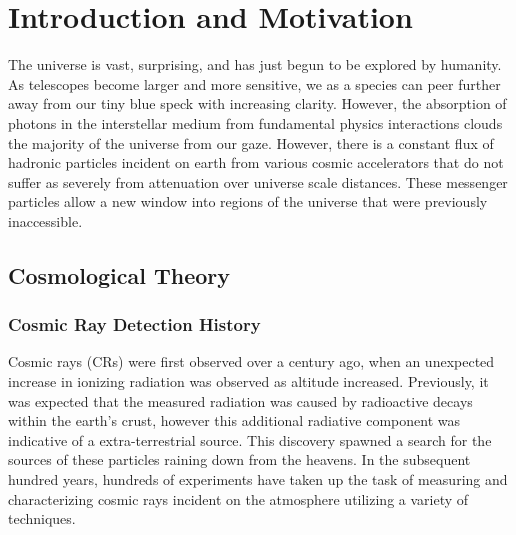 



\chapter{Introduction and Motivation}
		The universe is vast, surprising, and has just begun to be explored by humanity.  As telescopes become larger and more sensitive, we as a species can peer further away from our tiny blue speck with increasing clarity.  However, the absorption of photons in the interstellar medium from fundamental physics interactions clouds the majority of the universe from our gaze.  However, there is a constant flux of hadronic particles incident on earth from various cosmic accelerators that do not suffer as severely from attenuation over universe scale distances.  These messenger particles allow a new window into regions of the universe that were previously inaccessible.
\section{Cosmological Theory}
	\subsection{Cosmic Ray Detection History}
	Cosmic rays (CRs) were first observed over a century ago, when an unexpected increase in ionizing radiation was observed as altitude increased.\cite{HessCosmicRay}  Previously, it was expected that the measured radiation was caused by radioactive decays within the earth's crust, however this additional radiative component was indicative of a extra-terrestrial source.  This discovery spawned a search for the sources of these particles raining down from the heavens.  In the subsequent hundred years, hundreds of experiments have taken up the task of measuring and characterizing cosmic rays incident on the atmosphere utilizing a variety of techniques.\cite{Olive:2016xmw}  
	
